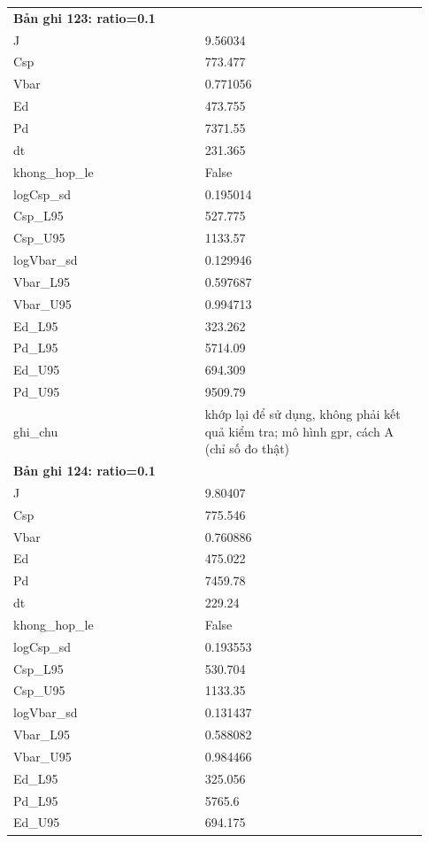 \begin{longtable}{p{0.43\linewidth}p{0.50\linewidth}}
\midrule
\multicolumn{2}{p{0.95\linewidth}}{\textbf{Bản ghi 123: ratio=0.1}} \\
J & 9.56034 \\
Csp & 773.477 \\
Vbar & 0.771056 \\
Ed & 473.755 \\
Pd & 7371.55 \\
dt & 231.365 \\
khong\_\allowbreak hop\_\allowbreak le & False \\
logCsp\_\allowbreak sd & 0.195014 \\
Csp\_\allowbreak L95 & 527.775 \\
Csp\_\allowbreak U95 & 1133.57 \\
logVbar\_\allowbreak sd & 0.129946 \\
Vbar\_\allowbreak L95 & 0.597687 \\
Vbar\_\allowbreak U95 & 0.994713 \\
Ed\_\allowbreak L95 & 323.262 \\
Pd\_\allowbreak L95 & 5714.09 \\
Ed\_\allowbreak U95 & 694.309 \\
Pd\_\allowbreak U95 & 9509.79 \\
ghi\_\allowbreak chu & khớp lại để sử dụng, không phải kết quả kiểm tra; mô hình gpr, cách A (chỉ số đo thật) \\
\midrule
\multicolumn{2}{p{0.95\linewidth}}{\textbf{Bản ghi 124: ratio=0.1}} \\
J & 9.80407 \\
Csp & 775.546 \\
Vbar & 0.760886 \\
Ed & 475.022 \\
Pd & 7459.78 \\
dt & 229.24 \\
khong\_\allowbreak hop\_\allowbreak le & False \\
logCsp\_\allowbreak sd & 0.193553 \\
Csp\_\allowbreak L95 & 530.704 \\
Csp\_\allowbreak U95 & 1133.35 \\
logVbar\_\allowbreak sd & 0.131437 \\
Vbar\_\allowbreak L95 & 0.588082 \\
Vbar\_\allowbreak U95 & 0.984466 \\
Ed\_\allowbreak L95 & 325.056 \\
Pd\_\allowbreak L95 & 5765.6 \\
Ed\_\allowbreak U95 & 694.175 \\

\end{longtable}
